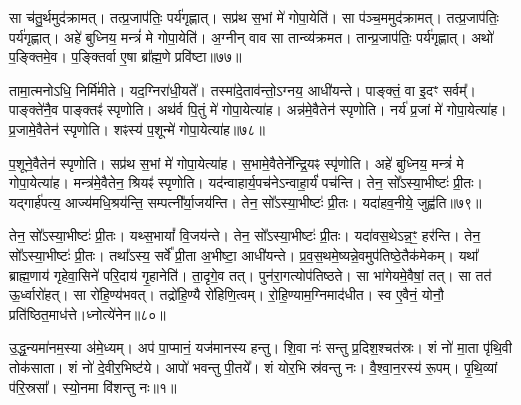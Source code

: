 सा च॑तु॒र्थमुद॑क्रामत्।
तत्प्र॒जा\-प॑तिः॒ पर्य॑गृह्णात्।
सप्र॑थ स॒भां मे॑ गोपा॒येति॑।
सा प॑ञ्च॒ममुद॑क्रामत्।
तत्प्र॒जा\-प॑तिः॒ पर्य॑गृह्णात्।
अहे॑ बुध्निय॒ मन्त्रं॑ मे गोपा॒येति॑।
अ॒ग्नीन् वाव सा तान्व्य॑क्रमत।
तान्प्र॒जा\-प॑तिः॒ पर्य॑गृह्णात्।
अथो॑ प॒ङ्क्तिमे॒व।
प॒ङ्क्तिर्वा ए॒षा ब्रा᳚ह्म॒णे प्रवि॑ष्टा॥७७॥\ip

तामा॒त्मनोऽधि॒ निर्मि॑मीते।
यद॒ग्निरा॑धी॒यते᳚।
तस्मा॑दे॒ताव॑न्तो॒\-ऽग्नय॒ आधी॑यन्ते।
पाङ्क्तं॒ वा इ॒दꣳ सर्वम्᳚।
पाङ्क्ते॑नै॒व पाङ्क्तꣴ॑ स्पृणोति।
अथ॑र्व पि॒तुं मे॑ गोपा॒येत्या॑ह।
अन्न॑मे॒वैतेन॑ स्पृणोति।
नर्य॑ प्र॒जां मे॑ गोपा॒येत्या॑ह।
प्र॒जामे॒वैतेन॑ स्पृणोति।
शꣴस्य॑ प॒शून्मे॑ गोपा॒येत्या॑ह॥७८॥\ip

प॒शूने॒वैतेन॑ स्पृणोति।
सप्र॑थ स॒भां मे॑ गोपा॒येत्या॑ह।
स॒भामे॒वैतेने᳚न्द्रि॒यꣴ स्पृ॑णोति।
अहे॑ बुध्निय॒ मन्त्रं॑ मे गोपा॒येत्या॑ह।
मन्त्र॑मे॒वैतेन॒ श्रियꣴ॑ स्पृणोति।
यद॑न्वाहार्य॒पच॑ने\-ऽन्वाहा॒र्यं॑ पच॑न्ति।
तेन॒ सो᳚\-ऽस्या॒भीष्टः॑ प्री॒तः।
यद्गार्\mbox{}ह॑पत्य॒ आज्य॑मधि॒श्रय॑न्ति॒ सम्पत्नी᳚र्या॒जय॑न्ति।
तेन॒ सो᳚\-ऽस्या॒भीष्टः॑ प्री॒तः।
यदा॑हव॒नीये॒ जुह्व॑ति॥७९॥\ip

तेन॒ सो᳚\-ऽस्या॒भीष्टः॑ प्री॒तः।
यथ्स॒भायां᳚ वि॒जय॑न्ते।
तेन॒ सो᳚\-ऽस्या॒भीष्टः॑ प्री॒तः।
यदा॑वस॒थे\-ऽन्न॒ꣳ॒ हर॑न्ति।
तेन॒ सो᳚\-ऽस्या॒भीष्टः॑ प्री॒तः।
तथा᳚ऽस्य॒ सर्वे᳚ प्री॒ता अ॒भीष्टा॒ आधी॑यन्ते।
प्र॒व॒स॒थमे॒ष्यन्ने॒वमुप॑तिष्ठे॒तैक॑मेकम्।
यथा᳚ ब्राह्म॒णाय॑ गृहेवा॒सिने॑ परि॒दाय॑ गृ॒हानेति॑।
ता॒दृगे॒व तत्।
पुन॑रा॒गत्योप॑तिष्ठते।
सा भा॑गेयमे॒वैषां॒ तत्।
सा तत॑ ऊ॒र्ध्वारो॑हत्।
सा रो॑हि॒ण्य॑भवत्।
तद्रो॑हि॒ण्यै रो॑हिणि॒त्वम्।
रो॒हि॒ण्याम॒ग्निमाद॑धीत।
स्व ए॒वैनं॒ योनौ॒ प्रति॑\-ष्ठित॒माध॑त्ते।ध्नोत्ये॑नेन॥८०॥\ip\anuvakamend[ए॒षा प॒शून्मे॑ गोपा॒येति॒ प्रवि॑ष्टा प॒शून्मे॑ गोपा॒येत्या॑ह॒ जुह्व॑ति तिष्ठते स॒प्त च॑]


\clearpage
{}
\setcounter{anuvakam}{0}

उ॒द्ध॒न्यमा॑नम॒स्या अ॑मे॒ध्यम्।
अप॑ पा॒प्मानं॒ यज॑मानस्य हन्तु।
शि॒वा नः॑ सन्तु प्र॒दिश॒श्चत॑स्रः।
शं नो॑ मा॒ता पृ॑थि॒वी तोक॑साता।
शं नो॑ दे॒वीर॒भिष्ट॑ये।
आपो॑ भवन्तु पी॒तये᳚।
शं योर॒भि स्र॑वन्तु नः।
वै॒श्वा॒न॒रस्य॑ रू॒पम्।
पृ॒थि॒व्यां प॑रि॒स्रसा᳚।
स्यो॒नमा वि॑शन्तु नः॥१॥\ip

